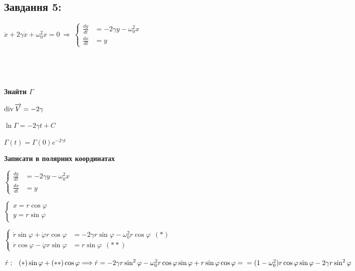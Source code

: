 \subsection{Завдання 5:}

$\ddot{x} + 2\gamma\dot{x}+\omega_0^2x = 0 \ \Longrightarrow \ 
\left\{\begin{aligned}
    \frac{dy}{dt} &= -2\gamma y -\omega_0^2x\\
    \frac{dx}{dt} &= y 
\end{aligned}\right.$

\begin{figure}[ht]
    \begin{minipage}[h]{0.49\linewidth}
         \\
    \end{minipage}
    \begin{minipage}[h]{0.49\linewidth}
         \\
    \end{minipage}
\end{figure}

\textbf{Знайти $\Gamma$}

$\operatorname*{div} \overrightarrow{V} = -2\gamma$

$\ln \Gamma = -2\gamma t + C$

$\Gamma(t) = \Gamma(0)e^{-2\gamma t}$

\textbf{Записати в полярних координатах}

$\left\{\begin{aligned}
    \frac{dy}{dt} &= -2\gamma y -\omega_0^2x\\
    \frac{dx}{dt} &= y 
\end{aligned}\right.$

$\left\{\begin{aligned}
    x = r\cos \varphi \\
    y = r\sin \varphi 
\end{aligned}\right.$

$\left\{\begin{aligned}
    \dot{r}\sin \varphi + \dot{\varphi}r \cos \varphi &=  -2\gamma r\sin \varphi - \omega_0^2 r\cos \varphi \ \ (*)\\
    \dot{r}\cos \varphi - \dot{\varphi} r \sin \varphi &= r \sin \varphi \ \ (**)
\end{aligned}\right.$

$\dot{r}:\ \ (*) \sin\varphi + (**)\cos\varphi \Longrightarrow \dot{r} = -2\gamma r\sin^2 \varphi - \omega_0^2 r\cos \varphi\sin\varphi + r\sin\varphi\cos\varphi =\\
= (1-\omega^2_0)r\cos\varphi\sin\varphi - 2\gamma r\sin^2\varphi $


